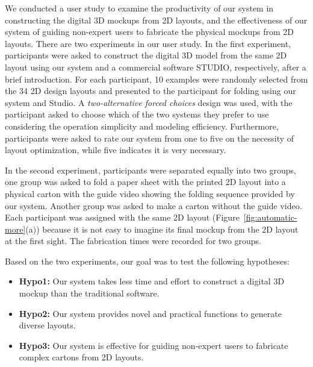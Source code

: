  
We conducted a user study to examine the productivity of our system in constructing the digital 3D mockups from 2D layouts, and the effectiveness of our system of guiding non-expert users to fabricate the physical mockups from 2D layouts. 
%
There are two experiments in our user study.
% 
In the first experiment, participants were asked to construct the digital 3D model from the same 2D layout using our system and a commercial software STUDIO, respectively, after a brief introduction.
For each participant, 10 examples were randomly selected from the 34 2D design layouts and presented to the participant for folding using our system and Studio.
A \emph{two-alternative forced choices} design was used, with the participant asked to choose which of the two systems they prefer to use considering the operation simplicity and modeling efficiency. 
%
Furthermore, participants were asked to rate our system from one to five on the necessity of layout optimization, while five indicates it is very necessary.


%
In the second experiment, participants were separated equally into two groups, one group was asked to fold a paper sheet with the printed 2D layout into a physical carton with the guide video showing the folding sequence provided by our system. Another group was asked to make a carton without the guide video. 
Each participant was assigned with the same 2D layout (Figure~\ref{fig:automatic-more}(a)) because it is not easy to imagine its final mockup from the 2D layout at the first sight.
%
The fabrication times were recorded for two groups.
%

Based on the two experiments, our goal was to test the following hypotheses:

\begin{itemize}
	\item \textbf{Hypo1:} Our system takes less time and effort to construct a digital 3D mockup than the traditional software.
	\item \textbf{Hypo2:} Our system provides novel and practical functions to generate diverse layouts.
	\item \textbf{Hypo3:} Our system is effective for guiding non-expert users to fabricate complex cartons from 2D layouts.
\end{itemize}

